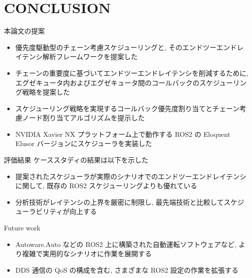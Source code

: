 
\section{CONCLUSION}
\label{sec: conslusion}

\begin{frame}{本論文の提案}
    \begin{itemize}
        \item 優先度駆動型のチェーン考慮スケジューリングと, そのエンドツーエンドレイテンシ解析フレームワークを提案した
        \item チェーンの重要度に基づいてエンドツーエンドレイテンシを削減するために, エグゼキュータ内およびエグゼキュータ間のコールバックのスケジューリング戦略を提案した
        \item スケジューリング戦略を実現するコールバック優先度割り当てとチェーン考慮ノード割り当てアルゴリズムを提示した
        \item NVIDIA Xavier NX プラットフォーム上で動作する ROS2 の Eloquent Elusor バージョンにスケジューラを実装した
    \end{itemize}
\end{frame}

\begin{frame}{評価結果}
    ケーススタディの結果は以下を示した
    \begin{itemize}
        \item 提案されたスケジューラが実際のシナリオでのエンドツーエンドレイテンシに関して, 既存の ROS2 スケジューリングよりも優れている
        \item 分析技術がレイテンシの上界を厳密に制限し, 最先端技術と比較してスケジューラビリティが向上する
    \end{itemize}
\end{frame}

\begin{frame}{Future work}
    \begin{itemize}
        \item Autoware.Auto などの ROS2 上に構築された自動運転ソフトウェアなど, より複雑で実用的なシナリオに作業を展開する
        \item DDS 通信の QoS の構成を含む, さまざまな ROS2 設定の作業を拡張する
    \end{itemize}
\end{frame}
